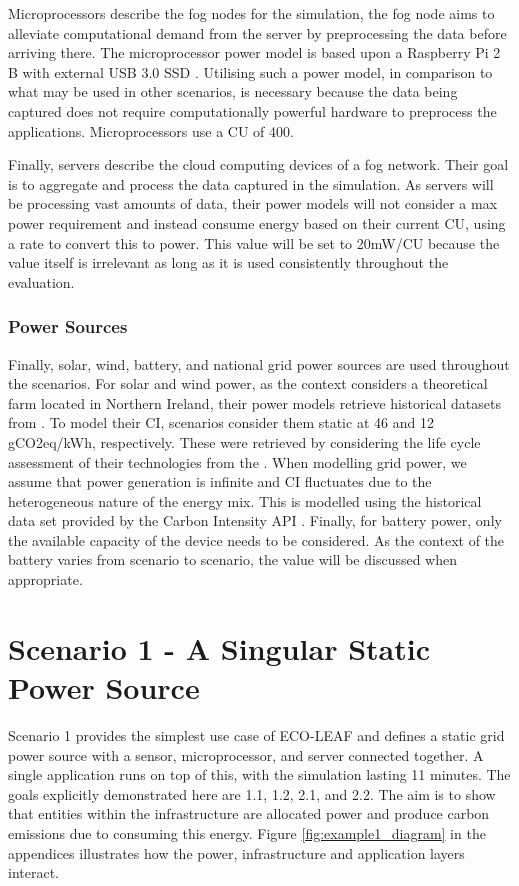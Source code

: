 \documentclass{l4proj}
\begin{document}
Microprocessors describe the fog nodes for the simulation, the fog node aims to alleviate computational demand from the server by preprocessing the data before arriving there.
The microprocessor power model is based upon a Raspberry Pi 2 B with external USB 3.0 SSD \citep{pidramble}.
Utilising such a power model, in comparison to what may be used in other scenarios, is necessary because the data being captured does not require computationally powerful hardware to preprocess the applications.
Microprocessors use a CU of 400.

Finally, servers describe the cloud computing devices of a fog network. Their goal is to aggregate and process the data captured in the simulation.
As servers will be processing vast amounts of data, their power models will not consider a max power requirement and instead consume energy based on their current CU, using a rate to convert this to power.
This value will be set to 20mW/CU because the value itself is irrelevant as long as it is used consistently throughout the evaluation.
\subsubsection{Power Sources}
Finally, solar, wind, battery, and national grid power sources are used throughout the scenarios.
For solar and wind power, as the context considers a theoretical farm located in Northern Ireland, their power models retrieve historical datasets from \cite{eirgrid}.
To model their CI, scenarios consider them static at 46 and 12 gCO2eq/kWh, respectively.
These were retrieved by considering the life cycle assessment of their technologies from the \cite{ipcc_synthesis_2014}.
When modelling grid power, we assume that power generation is infinite and CI fluctuates due to the heterogeneous nature of the energy mix.
This is modelled using the historical data set provided by the Carbon Intensity API \citep{carbon_intensity_api}.
Finally, for battery power, only the available capacity of the device needs to be considered.
As the context of the battery varies from scenario to scenario, the value will be discussed when appropriate.
\clearpage

\section{Scenario 1 - A Singular Static Power Source}\label{eval:subsec:scenario1}
Scenario 1 provides the simplest use case of ECO-LEAF and defines a static grid power source with a sensor, microprocessor, and server connected together.
A single application runs on top of this, with the simulation lasting 11 minutes.
The goals explicitly demonstrated here are 1.1, 1.2, 2.1, and 2.2.
The aim is to show that entities within the infrastructure are allocated power and produce carbon emissions due to consuming this energy.
Figure \ref{fig:example1_diagram} in the appendices illustrates how the power, infrastructure and application layers interact.
\end{document}
